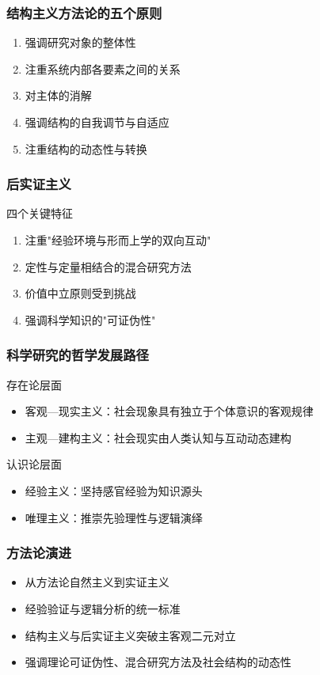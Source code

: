 \documentclass{beamer}
\begin{document}
\begin{frame}
\frametitle{结构主义方法论的五个原则}
\begin{enumerate}
\item 强调研究对象的整体性
\item 注重系统内部各要素之间的关系
\item 对主体的消解
\item 强调结构的自我调节与自适应
\item 注重结构的动态性与转换
\end{enumerate}
\end{frame}

\begin{frame}
\frametitle{后实证主义}
\begin{block}{四个关键特征}
\begin{enumerate}
\item 注重"经验环境与形而上学的双向互动"
\item 定性与定量相结合的混合研究方法
\item 价值中立原则受到挑战
\item 强调科学知识的"可证伪性"
\end{enumerate}
\end{block}
\end{frame}

\begin{frame}
\frametitle{科学研究的哲学发展路径}
\begin{block}{存在论层面}
\begin{itemize}
\item 客观---现实主义：社会现象具有独立于个体意识的客观规律
\item 主观---建构主义：社会现实由人类认知与互动动态建构
\end{itemize}
\end{block}

\begin{block}{认识论层面}
\begin{itemize}
\item 经验主义：坚持感官经验为知识源头
\item 唯理主义：推崇先验理性与逻辑演绎
\end{itemize}
\end{block}
\end{frame}

\begin{frame}
\frametitle{方法论演进}
\begin{itemize}
\item 从方法论自然主义到实证主义
\item 经验验证与逻辑分析的统一标准
\item 结构主义与后实证主义突破主客观二元对立
\item 强调理论可证伪性、混合研究方法及社会结构的动态性
\end{itemize}
\end{frame}
\end{document}
